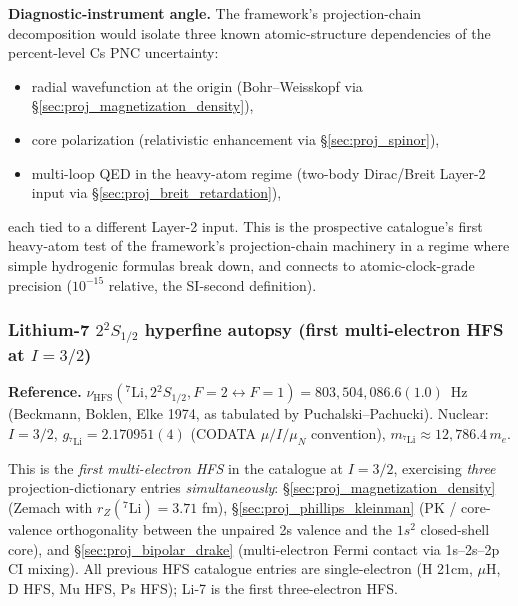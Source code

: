 \documentclass[11pt]{article}
\begin{document}
\textbf{Diagnostic-instrument angle.}  The framework's projection-chain
decomposition would isolate three known atomic-structure
dependencies of the percent-level Cs PNC uncertainty:
\begin{itemize}\setlength\itemsep{0pt}
\item radial wavefunction at the origin (Bohr--Weisskopf via
\S\ref{sec:proj_magnetization_density}),
\item core polarization (relativistic enhancement via
\S\ref{sec:proj_spinor}),
\item multi-loop QED in the heavy-atom regime (two-body Dirac/Breit
Layer-2 input via \S\ref{sec:proj_breit_retardation}),
\end{itemize}
each tied to a different Layer-2 input.  This is the prospective
catalogue's first heavy-atom test of the framework's projection-chain
machinery in a regime where simple hydrogenic formulas break down,
and connects to atomic-clock-grade precision ($10^{-15}$ relative,
the SI-second definition).

\subsubsection{Lithium-7 $2{}^2S_{1/2}$ hyperfine autopsy (first multi-electron HFS at $I=3/2$)}
\label{sec:autopsy_li7_hfs}

\textbf{Reference.}  $\nu_\text{HFS}({}^7\text{Li}, 2{}^2S_{1/2},
F=2 \leftrightarrow F=1) = 803{,}504{,}086.6(1.0)$~Hz
(Beckmann, Boklen, Elke 1974, as tabulated by Puchalski--Pachucki).  Nuclear:
$I=3/2$, $g_{{}^7\text{Li}} = 2.170951(4)$ (CODATA $\mu/I/\mu_N$
convention), $m_{{}^7\text{Li}} \approx 12{,}786.4\,m_e$.

This is the \emph{first multi-electron HFS} in the catalogue at
$I=3/2$, exercising \emph{three} projection-dictionary entries
\emph{simultaneously}: \S\ref{sec:proj_magnetization_density}
(Zemach with $r_Z({}^7\text{Li}) = 3.71$ fm),
\S\ref{sec:proj_phillips_kleinman} (PK / core-valence orthogonality
between the unpaired 2s valence and the $1s^2$ closed-shell core),
and \S\ref{sec:proj_bipolar_drake} (multi-electron Fermi contact
via 1s--2s--2p CI mixing).  All previous HFS catalogue entries
are single-electron (H 21cm, $\mu$H, D HFS, Mu HFS, Ps HFS); Li-7
is the first three-electron HFS.
\end{document}
